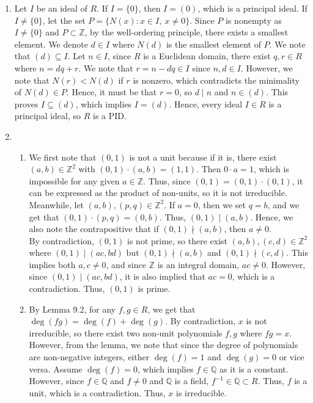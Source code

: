 \documentclass{article}
\begin{document}
\begin{enumerate}
\begin{enumerate}
\end{enumerate}

\newpage 

\item 
Let $I$ be an ideal of $R$. If $I=\{0\}$, then $I=(0)$, which is a principal ideal. If $I\neq\{0\}$, let the set $P=\{N(x): x\in I,\ x\neq 0\}$. Since $P$ is nonempty as $I\neq\{0\}$ and $P\subset \mathbb{Z}$, by the well-ordering principle, there exists a smallest element. We denote $d\in I$ where $N(d)$ is the smallest element of $P$. We note that $(d)\subseteq I$. Let $n\in I$, since $R$ is a Euclidean domain, there exist $q,r\in R$ where $n=dq+r$. We note that $r=n-dq\in I$ since $n,d\in I$. However, we note that $N(r)<N(d)$ if $r$ is nonzero, which contradicts the minimality of $N(d)\in P$. Hence, it must be that $r=0$, so $d\mid n$ and $n\in(d)$. This proves $I\subseteq(d)$, which implies $I=(d)$. Hence, every ideal $I\in R$ is a principal ideal, so $R$ is a PID.


\newpage

\item 
\begin{enumerate}
    \item 
    We first note that $(0, 1)$ is not a unit because if it is, there exist $(a, b) \in \mathbb{Z}^2$ with $(0, 1)\cdot(a,b)=(1,1)$. Then $0 \cdot a = 1$, which is impossible for any given $a \in \mathbb{Z}$. Thus, since $(0, 1) = (0, 1) \cdot (0,1)$, it can be expressed as the product of non-units, so it is not irreducible. \\

    Meanwhile, let $(a, b), (p, q) \in \mathbb{Z}^2$. If $a = 0$, then we set $q = b$, and we get that $(0, 1) \cdot (p, q) = (0, b)$. Thus, $(0, 1) \mid (a,b)$. Hence, we also note the contrapositive that if $(0, 1) \nmid (a, b)$, then $a \neq 0$. \\
    
    By contradiction, $(0, 1)$ is not prime, so there exist $(a, b), (c, d) \in \mathbb{Z}^2$ where $(0, 1) \mid (ac, bd)$ but $(0, 1) \nmid (a, b)$ and $(0, 1) \nmid (c, d)$. This implies both $a, c \neq 0$, and since $\mathbb{Z}$ is an integral domain, $ac \neq 0$. However, since  $(0, 1) \mid (ac, bd)$, it is also implied that $ac = 0$, which is a contradiction. Thus, $(0, 1)$ is prime. \\


    \item 
    By Lemma 9.2, for any $f, g \in R$, we get that $\deg(fg) = \deg(f) + \deg(g)$. By contradiction, $x$ is not irreducible, so there exist two non-unit polynomials $f, g$ where $fg = x$. However, from the lemma, we note that since the degree of polynomials are non-negative integers, either $\deg(f) = 1$ and $\deg(g) = 0$ or vice versa. Assume $\deg(f) = 0$, which implies $f \in \mathbb{Q}$ as it is a constant. However, since $f \in \mathbb{Q}$ and $f \neq 0$ and $\mathbb{Q}$ is a field, $f^{-1} \in \mathbb{Q} \subset R$. Thus, $f$ is a unit, which is a contradiction. Thus, $x$ is irreducible. \\


\end{enumerate}
\end{enumerate}
\end{document}
